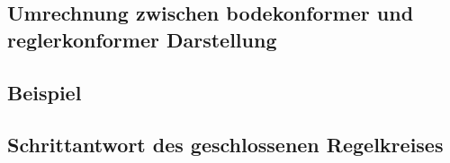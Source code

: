 \subsection{Umrechnung zwischen bodekonformer und reglerkonformer Darstellung}


\clearpage
\subsection{Beispiel}


\subsection{Schrittantwort des geschlossenen Regelkreises}

